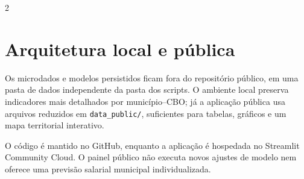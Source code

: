 \documentclass[10pt,a4paper]{article}
\begin{document}
\begin{multicols}{2}
\section{Arquitetura local e pública}
Os microdados e modelos persistidos ficam fora do repositório público, em uma pasta de dados independente da pasta dos scripts. O ambiente local preserva indicadores mais detalhados por município--CBO; já a aplicação pública usa arquivos reduzidos em \texttt{data\_public/}, suficientes para tabelas, gráficos e um mapa territorial interativo.

O código é mantido no GitHub, enquanto a aplicação é hospedada no Streamlit Community Cloud. O painel público não executa novos ajustes de modelo nem oferece uma previsão salarial municipal individualizada.
\end{multicols}
\end{document}
